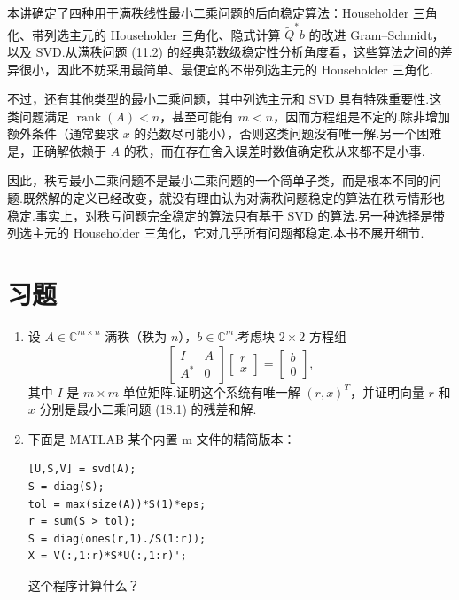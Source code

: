 \documentclass[UTF8,fontset=none,12pt]{ctexart}
\newcommand{\C}{\mathbb{C}}
\theoremstyle{definition}
\begin{document}
本讲确定了四种用于满秩线性最小二乘问题的后向稳定算法：Householder 三角化、带列选主元的 Householder 三角化、隐式计算 $\widetilde Q^*b$ 的改进 Gram--Schmidt，以及 SVD.从满秩问题 (11.2) 的经典范数级稳定性分析角度看，这些算法之间的差异很小，因此不妨采用最简单、最便宜的不带列选主元的 Householder 三角化.

不过，还有其他类型的最小二乘问题，其中列选主元和 SVD 具有特殊重要性.这类问题满足 $\operatorname{rank}(A)<n$，甚至可能有 $m<n$，因而方程组是不定的.除非增加额外条件（通常要求 $x$ 的范数尽可能小），否则这类问题没有唯一解.另一个困难是，正确解依赖于 $A$ 的秩，而在存在舍入误差时数值确定秩从来都不是小事.

因此，秩亏最小二乘问题不是最小二乘问题的一个简单子类，而是根本不同的问题.既然解的定义已经改变，就没有理由认为对满秩问题稳定的算法在秩亏情形也稳定.事实上，对秩亏问题完全稳定的算法只有基于 SVD 的算法.另一种选择是带列选主元的 Householder 三角化，它对几乎所有问题都稳定.本书不展开细节.

\section*{习题}

\begin{enumerate}[label=\textbf{19.\arabic*}]
    \item 设 $A\in\C^{m\times n}$ 满秩（秩为 $n$），$b\in\C^m$.考虑块 $2\times2$ 方程组
    \begin{equation}
    \begin{bmatrix}I&A\\A^*&0\end{bmatrix}
    \begin{bmatrix}r\\x\end{bmatrix}
    =\begin{bmatrix}b\\0\end{bmatrix},
    \tag{19.4}
    \end{equation}
    其中 $I$ 是 $m\times m$ 单位矩阵.证明这个系统有唯一解 $(r,x)^T$，并证明向量 $r$ 和 $x$ 分别是最小二乘问题 (18.1) 的残差和解.

    \item 下面是 MATLAB 某个内置 m 文件的精简版本：
    \begin{verbatim}
[U,S,V] = svd(A);
S = diag(S);
tol = max(size(A))*S(1)*eps;
r = sum(S > tol);
S = diag(ones(r,1)./S(1:r));
X = V(:,1:r)*S*U(:,1:r)';
    \end{verbatim}
    这个程序计算什么？
\end{enumerate}
\end{document}
